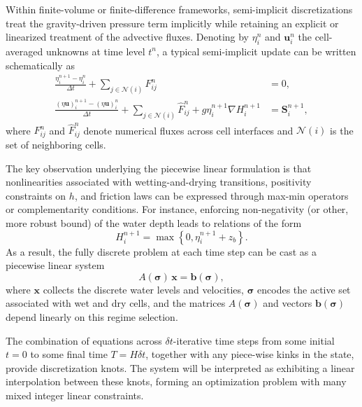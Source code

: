 \documentclass{article}
\newcommand{\1}{\mathds{1}}          %
\theoremstyle{definition}
\begin{document}
\begin{sloppypar}
Within finite-volume or finite-difference frameworks, semi-implicit discretizations treat the gravity-driven pressure term implicitly while retaining an explicit or linearized treatment of the advective fluxes. Denoting by $\eta_i^{n}$ and $\mathbf{u}_i^{n}$ the cell-averaged unknowns at time level $t^n$, a typical semi-implicit update can be written schematically as
\begin{equation}
\begin{aligned}
\frac{\eta_i^{n+1} -\eta_i^{n}}{\Delta t}
+ \sum_{j \in \mathcal{N}(i)} F_{ij}^{n} &= 0, \\
\frac{(\eta\mathbf{u})_i^{n+1} - (\eta\mathbf{u})_i^{n}}{\Delta t}
+ \sum_{j \in \mathcal{N}(i)} \widehat{F}_{ij}^{n}
+ g\eta_i^{n+1} \nabla H_i^{n+1} &= \mathbf{S}_i^{n+1},
\end{aligned}
\label{eq:SWE_semiimplicit}
\end{equation}
where $F_{ij}^{n}$ and $\widehat{F}_{ij}^{n}$ denote numerical fluxes across cell interfaces and $\mathcal{N}(i)$ is the set of neighboring cells.

The key observation underlying the piecewise linear formulation is that nonlinearities associated with wetting-and-drying transitions, positivity constraints on $h$, and friction laws can be expressed through max-min operators or complementarity conditions. For instance, enforcing non-negativity (or other, more robust bound) of the water depth leads to relations of the form
\begin{equation}
H_i^{n+1} = \max\!\left\{0, \eta_i^{n+1}+z_b\right\}.
\label{eq:positivity}
\end{equation}
As a result, the fully discrete problem at each time step can be cast as a piecewise linear system
\begin{equation}
A(\boldsymbol{\sigma}) \, \mathbf{x} = \mathbf{b}(\boldsymbol{\sigma}),
\label{eq:PL_system}
\end{equation}
where $\mathbf{x}$ collects the discrete water levels and velocities, $\boldsymbol{\sigma}$ encodes the active set associated with wet and dry cells, and the matrices $A(\boldsymbol{\sigma})$ and vectors $\mathbf{b}(\boldsymbol{\sigma})$ depend linearly on this regime selection. 

The combination of equations across $\delta t$-iterative time steps from some initial $t=0$ to some final time $T=H\delta t$, together with any piece-wise kinks in the state, provide discretization knots. The system will be interpreted as exhibiting a linear interpolation between these knots, forming an optimization problem with many mixed integer linear constraints. 


\end{sloppypar}
\end{document}
